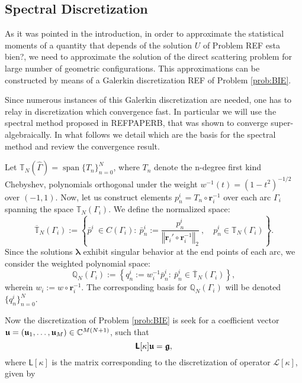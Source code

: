 \documentclass[10pt,reqno]{amsart}
\newcommand{\IT}{\mathbb{T}}
\newcommand{\IQ}{\mathbb{Q}}
\theoremstyle{remark}
\newcommand{\norm}[1]{\left\Vert #1 \right\Vert}
\newcommand{\vr}{\mathbf{r}}
\newcommand{\opL}{\mathcal{L}}
\newcommand{\matL}{\mathsf{L}}
\newcommand{\bmatL}{\boldsymbol{\matL}}
\DeclareMathOperator{\Span}{span}
\newcommand{\wGamma}{\widehat{\Gamma}}
\newcommand{\vlambda}{\boldsymbol{\lambda}}
\newcommand{\vfu}{\boldsymbol{\frak{u}}}
\newcommand{\vfg}{\boldsymbol{\frak{g}}}
\newcommand{\jp}[1]{{\color{blue} #1}}
\numberwithin{equation}{section}
\begin{document}
\subsection{Spectral Discretization}

As it was pointed in the introduction, in order to approximate the statistical moments of a quantity that depends of the solution $U$ of Problem REF \jp{esta bien?}, we need to approximate the solution of the direct scattering problem for large number of geometric configurations. This approximations can be constructed by means of a Galerkin discretization REF of Problem \ref{prob:BIE}. 

Since numerous instances of this Galerkin discretization are needed, one has to relay in discretization which  convergence fast. In particular we will use the spectral method proposed in REFPAPERB, that was shown to converge super-algebraically. In what follows we detail which are the basis for the spectral method and review the convergence result. 

 Let $\IT_N(\wGamma) = \Span \{ T_n \}_{n=0}^N$, where $T_n$ denote the n-degree first kind Chebyshev, polynomials orthogonal under the weight $w^{-1}(t) = (1-t^2)^{-1/2}$ over $(-1,1)$. Now, let us construct elements $p^i_n = T_n \circ \vr_i^{-1}$ over each arc $\Gamma_i$ spanning the space $\IT_N(\Gamma_i)$.  We define the normalized space:
\begin{equation}
\overline{\IT}_N(\Gamma_i) := \left\{ \bar{p}^i {\ \in C(\Gamma_i)}  : \ \bar{p}^i_n := \frac{p^i_n}{\norm{\vr_i' \circ \vr^{-1}_i}_{2}}\ , \quad p^i_n \in \IT_N(\Gamma_i)\right\}.
\end{equation}
Since the solutions $\vlambda$ exhibit singular behavior at the end points of each arc, we consider the weighted polynomial space: 
\begin{equation}
\label{eq:QN}
\IQ_N(\Gamma_i) := \left\{ q^i_n:=w_i^{-1} \bar{p}^i_n  : \ \bar{p}^i_n \in \overline{\IT}_N(\Gamma_i) \right\},
\end{equation}
wherein $w_i:=w\circ \vr^{-1}_i$. The corresponding basis for ${\IQ}_N(\Gamma_i)$ will be denoted $\{q^i_n\}_{n=0}^N$. 

Now the discretization of Problem \ref{prob:BIE} is seek for a coefficient vector $\vfu=(\vfu_1,\ldots,\vfu_M)\in\mathbb{C}^{M(N+1)}$, such that 
\begin{equation}\label{eq:linsys}
\bmatL[\kappa] \vfu = \vfg,
\end{equation}
where $\bmatL[\kappa]$ is the matrix corresponding to the discretization of operator $\opL[\kappa]$, given by
\end{document}
